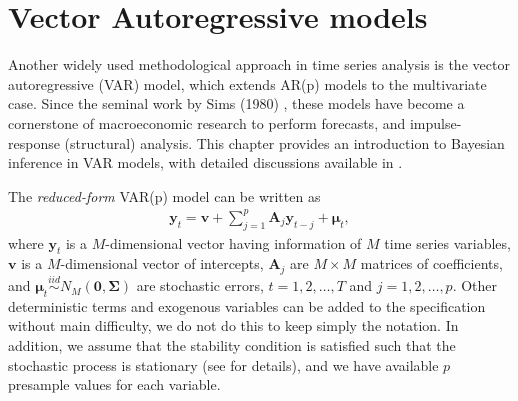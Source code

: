 \section{Vector Autoregressive models}\label{sec84}
Another widely used methodological approach in time series analysis is the vector autoregressive (VAR) model, which extends AR(p) models to the multivariate case. Since the seminal work by Sims (1980) \cite{sims1980macroeconomics}, these models have become a cornerstone of macroeconomic research to perform forecasts, and impulse-response (structural) analysis. This chapter provides an introduction to Bayesian inference in VAR models, with detailed discussions available in \cite{koop2010bayesian,DelNegro2011VAR,wozniak2016bayesian,chan2019bayesian}.

The \textit{reduced-form} VAR(p) model can be written as
\begin{align}\label{eqVAR}
	\bm{y}_t=\bm{v} + \sum_{j=1}^p\bm{A}_{j}\bm{y}_{t-j}+\bm{\mu}_t,
\end{align}
where $\bm{y}_t$ is a $M$-dimensional vector having information of $M$ time series variables, $\bm{v}$ is a $M$-dimensional vector of intercepts, $\bm{A}_{j}$ are $M\times M$ matrices of coefficients, and $\bm{\mu}_t \stackrel{iid}{\sim} N_M(\bm{0}, \bm{\Sigma})$ are stochastic errors, $t=1,2,\dots,T$ and $j=1,2,\dots,p$. Other deterministic terms and exogenous variables can be added to the specification without main difficulty, we do not do this to keep simply the notation. In addition, we assume that the stability condition is satisfied such that the stochastic process is stationary (see \cite[Chap.~2]{helmut2005new} for details), and we have available $p$ presample values for each variable. 

